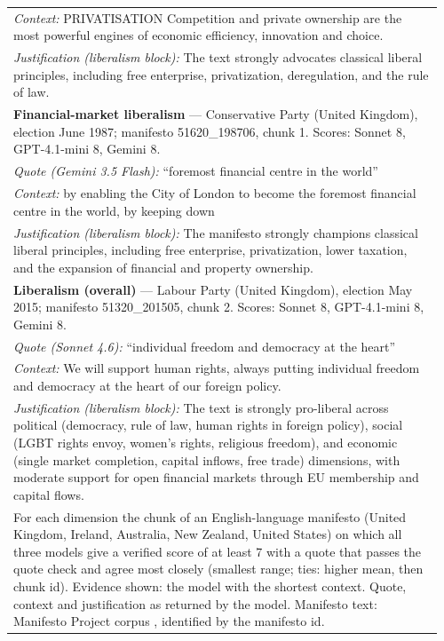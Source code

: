 {\begin{longtable}{p{0.96\linewidth}}
\quad \emph{Context:} PRIVATISATION Competition and private ownership are the most powerful engines of economic efficiency, innovation and choice. \\
\quad \emph{Justification (liberalism block):} The text strongly advocates classical liberal principles, including free enterprise, privatization, deregulation, and the rule of law. \\
\midrule
\textbf{Financial-market liberalism} --- Conservative Party (United Kingdom), election June 1987; manifesto 51620\_198706, chunk 1. Scores: Sonnet 8, GPT-4.1-mini 8, Gemini 8. \\
\quad \emph{Quote (Gemini 3.5 Flash):} ``foremost financial centre in the world'' \\
\quad \emph{Context:} by enabling the City of London to become the foremost financial centre in the world, by keeping down \\
\quad \emph{Justification (liberalism block):} The manifesto strongly champions classical liberal principles, including free enterprise, privatization, lower taxation, and the expansion of financial and property ownership. \\
\midrule
\textbf{Liberalism (overall)} --- Labour Party (United Kingdom), election May 2015; manifesto 51320\_201505, chunk 2. Scores: Sonnet 8, GPT-4.1-mini 8, Gemini 8. \\
\quad \emph{Quote (Sonnet 4.6):} ``individual freedom and democracy at the heart'' \\
\quad \emph{Context:} We will support human rights, always putting individual freedom and democracy at the heart of our foreign policy. \\
\quad \emph{Justification (liberalism block):} The text is strongly pro-liberal across political (democracy, rule of law, human rights in foreign policy), social (LGBT rights envoy, women's rights, religious freedom), and economic (single market completion, capital inflows, free trade) dimensions, with moderate support for open financial markets through EU membership and capital flows. \\
\bottomrule
\multicolumn{1}{p{0.96\linewidth}}{\scriptsize For each dimension the chunk of an English-language manifesto (United Kingdom, Ireland, Australia, New Zealand, United States) on which all three models give a verified score of at least 7 with a quote that passes the quote check and agree most closely (smallest range; ties: higher mean, then chunk id). Evidence shown: the model with the shortest context. Quote, context and justification as returned by the model. Manifesto text: Manifesto Project corpus \citep{lehmann2026manifesto}, identified by the manifesto id.} \\
\end{longtable}
}
